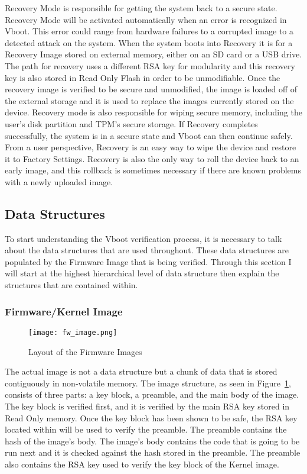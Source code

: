 \documentclass[../report.tex]{subfiles}
\begin{document}
Recovery Mode is responsible for getting the system back to a secure state.
Recovery Mode will be activated automatically when an error is recognized in Vboot.
This error could range from hardware failures to a corrupted image to a detected attack on the system.
When the system boots into Recovery it is for a Recovery Image stored on external memory, either on an SD card or a USB drive.
The path for recovery uses a different RSA key for modularity and this recovery key is also stored in Read Only Flash in order to be unmodifiable.
Once the recovery image is verified to be secure and unmodified, the image is loaded off of the external storage and it is used to replace the images currently stored on the device.
Recovery mode is also responsible for wiping secure memory, including the user's disk partition and TPM's secure storage.
If Recovery completes successfully, the system is in a secure state and Vboot can then continue safely.
From a user perspective, Recovery is an easy way to wipe the device and restore it to Factory Settings.
Recovery is also the only way to roll the device back to an early image, and this rollback is sometimes necessary if there are known problems with a newly uploaded image.

\subsection{Data Structures}\label{sec:data-structures}

To start understanding the Vboot verification process, it is necessary to talk about the data structures that are used throughout. 
These data structures are populated by the Firmware Image that is being
verified. 
Through this section I will start at the highest hierarchical level of data structure then explain the structures that are contained within.

\subsubsection{Firmware/Kernel Image}

\begin{figure}
    \centering
    \texttt{[image: fw\_image.png]}
    \caption{Layout of the Firmware Images~\cite{vboot-data-structures}}
    \label{fig:vboot_images}
\end{figure}

The actual image is not a data structure but a chunk of data that is stored contiguously in non-volatile memory.
The image structure, as seen in Figure~\ref{fig:vboot_images}, consists of three parts: a key block, a preamble, and the main body of the image.
The key block is verified first, and it is verified by the main RSA key stored in Read Only memory.
Once the key block has been shown to be safe, the RSA key located within will be used to verify the preamble.
The preamble contains the hash of the image's body.
The image's body contains the code that is going to be run next and it is checked against the hash stored in the preamble.
The preamble also contains the RSA key used to verify the key block of the Kernel image.
\end{document}
